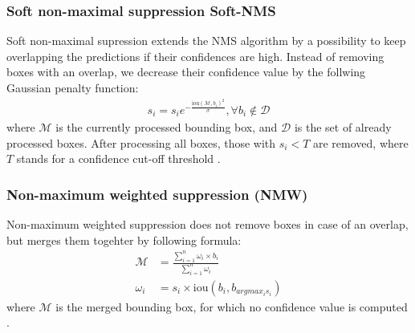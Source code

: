\subsubsection{Soft non-maximal suppression {Soft-NMS}}
Soft non-maximal supression extends the NMS algorithm by a possibility to keep overlapping the predictions if their confidences are high. Instead of removing boxes with an overlap, we decrease their confidence value by the follwing Gaussian penalty function:
\begin{align}
    s_i = s_i e^{-\frac{\text{iou}\left( \mathcal{M}, b_i \right)^2}{\sigma}}, \forall b_i \notin \mathcal{D}
\end{align}
where $\mathcal{M}$ is the currently processed bounding box, and $\mathcal{D}$ is the set of already processed boxes. After processing all boxes, those with $s_i < T$ are removed, where $T$ stands  for a confidence cut-off threshold \cite{Bodla2017}.

\subsubsection{Non-maximum weighted suppression (NMW)}
Non-maximum weighted suppression does not remove boxes in case of an overlap, but merges them togehter by following formula:
\begin{align}
    \mathcal{M} & = \frac{\sum_{i=1}^n \omega_i \times b_i}{\sum_{i=1}^n \omega_i} \\
    \omega_i    & = s_i \times \text{iou} \left( b_i, b_{ argmax_i s_i} \right)
\end{align}
where $\mathcal{M}$ is the merged bounding box, for which no confidence value is computed \cite{Zhou2017,Solovyev2019}.

